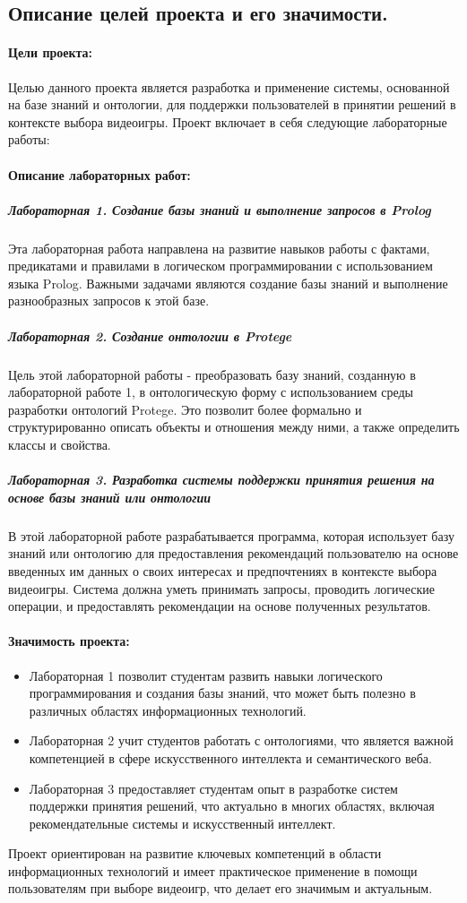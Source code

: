 \documentclass[12pt,onecolumn]{article}
\begin{document}
\subsection{Описание целей проекта и его значимости.}
\paragraph{Цели проекта:}
Целью данного проекта является разработка и применение системы, основанной на базе знаний и онтологии, для поддержки пользователей в принятии решений в контексте выбора видеоигры. Проект включает в себя следующие лабораторные работы:
\paragraph{Описание лабораторных работ:}
\subparagraph{Лабораторная 1. Создание базы знаний и выполнение запросов в Prolog}
Эта лабораторная работа направлена на развитие навыков работы с фактами, предикатами и правилами в логическом программировании с использованием языка Prolog. Важными задачами являются создание базы знаний и выполнение разнообразных запросов к этой базе.
\subparagraph{Лабораторная 2. Создание онтологии в Protege}
Цель этой лабораторной работы - преобразовать базу знаний, созданную в лабораторной работе 1, в онтологическую форму с использованием среды разработки онтологий Protege. Это позволит более формально и структурированно описать объекты и отношения между ними, а также определить классы и свойства.
\subparagraph{Лабораторная 3. Разработка системы поддержки принятия решения на основе базы знаний или онтологии}
В этой лабораторной работе разрабатывается программа, которая использует базу знаний или онтологию для предоставления рекомендаций пользователю на основе введенных им данных о своих интересах и предпочтениях в контексте выбора видеоигры. Система должна уметь принимать запросы, проводить логические операции, и предоставлять рекомендации на основе полученных результатов.
\paragraph{Значимость проекта:}
\begin{itemize}
  \item Лабораторная 1 позволит студентам развить навыки логического программирования и создания базы знаний, что может быть полезно в различных областях информационных технологий.
  \item Лабораторная 2 учит студентов работать с онтологиями, что является важной компетенцией в сфере искусственного интеллекта и семантического веба.
  \item Лабораторная 3 предоставляет студентам опыт в разработке систем поддержки принятия решений, что актуально в многих областях, включая рекомендательные системы и искусственный интеллект.
\end{itemize}
Проект ориентирован на развитие ключевых компетенций в области информационных технологий и имеет практическое применение в помощи пользователям при выборе видеоигр, что делает его значимым и актуальным.
\end{document}
